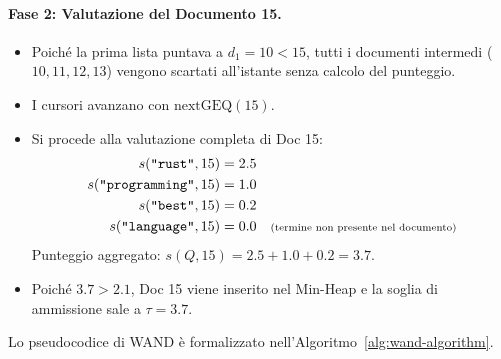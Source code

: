 \paragraph{Fase 2: Valutazione del Documento 15.}
\begin{itemize}
    \item Poich\'e la prima lista puntava a $d_1 = 10 < 15$, tutti i documenti intermedi ($10, 11, 12, 13$) vengono scartati all'istante senza calcolo del punteggio.
    \item I cursori avanzano con $\text{nextGEQ}(15)$.
    \item Si procede alla valutazione completa di Doc 15:
    \begin{align*}
        s(\text{\texttt{"rust"}}, 15) &= 2.5 \\
        s(\text{\texttt{"programming"}}, 15) &= 1.0 \\
        s(\text{\texttt{"best"}}, 15) &= 0.2 \\
        s(\text{\texttt{"language"}}, 15) &= 0.0 \quad \text{\scriptsize (termine non presente nel documento)}
    \end{align*}
    Punteggio aggregato: $s(Q, 15) = 2.5 + 1.0 + 0.2 = 3.7$.
    \item Poich\'e $3.7 > 2.1$, Doc 15 viene inserito nel Min-Heap e la soglia di ammissione sale a $\tau = 3.7$.
\end{itemize}

Lo pseudocodice di WAND \`e formalizzato nell'Algoritmo~\ref{alg:wand-algorithm}.


